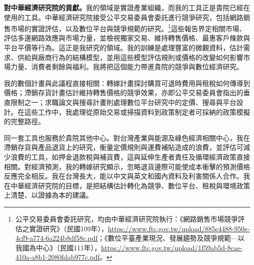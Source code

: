 \documentclass[11pt,letterpaper]{article}
\begin{document}
\medskip
\noindent\textbf{對中華經濟研究院的貢獻。}我的領域是實證產業組織，而我的工具正是貴院已經在使用的工具。中華經濟研究院接受公平交易委員會委託進行競爭研究，包括網路銷售市場的實證評估，以及數位平台與競爭規範的研究。\footnote{公平交易委員會委託研究，均由中華經濟研究院執行：《網路銷售市場競爭評估之實證研究》（民國109年），\url{https://www.ftc.gov.tw/upload/885e4488-950e-4cf9-a774-6a224b8df58c.pdf}；《數位平臺產業現況、發展趨勢及競爭規範—以我國為中心》（民國111年），\url{https://www.ftc.gov.tw/upload/1f59ab5d-8cae-410a-a8b1-2080fdab977c.pdf}。}這些報告界定相關市場、評估多邊網路效應與市場力量，並檢視獨家交易、維持轉售價格、最惠客戶條款與平台平價等行為。這正是我研究的領域。我的訓練是處理豐富的微觀資料，估計需求、供給與廠商行為的結構模型，並用這些模型評估規則或價格的改變如何影響市場力量、消費者剩餘與福利。我將把這個能力帶進貴院的競爭與數位經濟研究。

我的數個計畫與此議程直接相關：轉嫁計畫探討購買可退時費用與租稅如何傳導到價格；滯銷存貨計畫估計維持轉售價格的競爭效果，亦即公平交易委員會指出的垂直限制之一；求職論文與搜尋計畫則處理數位平台研究中的定價、搜尋與平台設計。在這些工作中，我處理從原始交易或掃描資料到政策制定者可採納的政策模擬的完整路徑。

同一套工具也服務於貴院其他中心。對台灣產業與能源及綠色經濟相關中心，我在滯銷存貨與產品退貨上的研究，衡量定價規則與運費補貼造成的浪費，並評估可減少浪費的工具，如押金退款稅與補貨費，這與延伸生產者責任及循環經濟政策直接相關。對經濟預測，我的轉嫁研究顯示，忽略退貨邊際可能使成本衝擊的預測價格反應完全相反。我在台灣長大，能以中文與英文和國內資料及利害關係人合作。我在中華經濟研究院的目標，是把結構估計轉化為競爭、數位平台、租稅與環境政策上清楚、以證據為本的建議。
\end{document}
